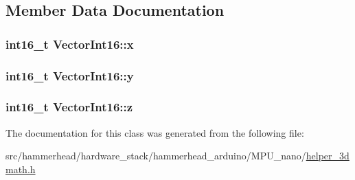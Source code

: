 \subsection{Member Data Documentation}
\subsubsection[{\texorpdfstring{x}{x}}]{\setlength{\rightskip}{0pt plus 5cm}int16\+\_\+t Vector\+Int16\+::x}\hypertarget{classVectorInt16_a648435b4c99e9da9c95549ac344beaec}{}\label{classVectorInt16_a648435b4c99e9da9c95549ac344beaec}
\subsubsection[{\texorpdfstring{y}{y}}]{\setlength{\rightskip}{0pt plus 5cm}int16\+\_\+t Vector\+Int16\+::y}\hypertarget{classVectorInt16_a5d340e1f1bcbc064e5084ca609a6a6a3}{}\label{classVectorInt16_a5d340e1f1bcbc064e5084ca609a6a6a3}
\subsubsection[{\texorpdfstring{z}{z}}]{\setlength{\rightskip}{0pt plus 5cm}int16\+\_\+t Vector\+Int16\+::z}\hypertarget{classVectorInt16_af1b5c4c297bdd32751ab4519480b919f}{}\label{classVectorInt16_af1b5c4c297bdd32751ab4519480b919f}


The documentation for this class was generated from the following file\+:\begin{DoxyCompactItemize}
\item 
src/hammerhead/hardware\+\_\+stack/hammerhead\+\_\+arduino/\+M\+P\+U\+\_\+nano/\hyperlink{helper__3dmath_8h}{helper\+\_\+3dmath.\+h}\end{DoxyCompactItemize}
